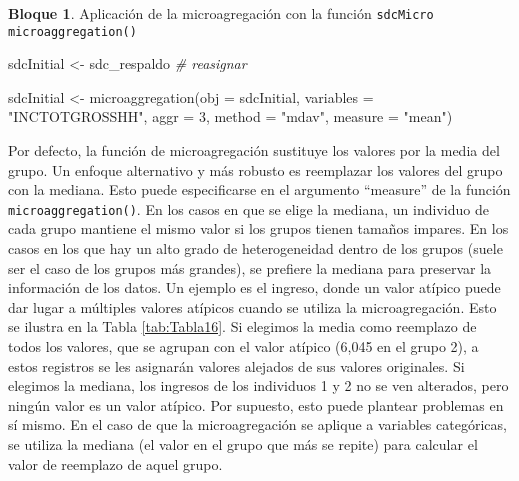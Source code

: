 \documentclass[
]{book}
\newenvironment{Shaded}{\begin{snugshade}}{\end{snugshade}}
\newcommand{\AttributeTok}[1]{\textcolor[rgb]{0.77,0.63,0.00}{#1}}
\newcommand{\CommentTok}[1]{\textcolor[rgb]{0.56,0.35,0.01}{\textit{#1}}}
\newcommand{\DecValTok}[1]{\textcolor[rgb]{0.00,0.00,0.81}{#1}}
\newcommand{\FunctionTok}[1]{\textcolor[rgb]{0.00,0.00,0.00}{#1}}
\newcommand{\NormalTok}[1]{#1}
\newcommand{\OtherTok}[1]{\textcolor[rgb]{0.56,0.35,0.01}{#1}}
\newcommand{\StringTok}[1]{\textcolor[rgb]{0.31,0.60,0.02}{#1}}
\theoremstyle{definition}
\theoremstyle{definition}
\newtheorem{example}{Bloque}[chapter]
\theoremstyle{definition}
\theoremstyle{definition}
\theoremstyle{remark}
\begin{document}
\hypertarget{section-4}{%
\subsubsection{}\label{section-4}}

\begin{example}
\protect\hypertarget{exm:bloque30jgm}{}\label{exm:bloque30jgm}Aplicación de la microagregación con la función \texttt{sdcMicro} \texttt{microaggregation()}
\end{example}

\begin{Shaded}
\begin{Highlighting}[]
\NormalTok{sdcInitial }\OtherTok{\textless{}{-}}\NormalTok{ sdc\_respaldo }\CommentTok{\# reasignar}

\NormalTok{sdcInitial }\OtherTok{\textless{}{-}} \FunctionTok{microaggregation}\NormalTok{(}\AttributeTok{obj =}\NormalTok{ sdcInitial, }\AttributeTok{variables =} \StringTok{"INCTOTGROSSHH"}\NormalTok{, }\AttributeTok{aggr =} \DecValTok{3}\NormalTok{, }\AttributeTok{method =} \StringTok{"mdav"}\NormalTok{, }\AttributeTok{measure =} \StringTok{"mean"}\NormalTok{)}
\end{Highlighting}
\end{Shaded}

Por defecto, la función de microagregación sustituye los valores por la media del grupo. Un enfoque alternativo y más robusto es reemplazar los valores del grupo con la mediana. Esto puede especificarse en el argumento ``measure'' de la función \texttt{microaggregation()}. En los casos en que se elige la mediana, un individuo de cada grupo mantiene el mismo valor si los grupos tienen tamaños impares. En los casos en los que hay un alto grado de heterogeneidad dentro de los grupos (suele ser el caso de los grupos más grandes), se prefiere la mediana para preservar la información de los datos. Un ejemplo es el ingreso, donde un valor atípico puede dar lugar a múltiples valores atípicos cuando se utiliza la microagregación. Esto se ilustra en la Tabla \ref{tab:Tabla16}. Si elegimos la media como reemplazo de todos los valores, que se agrupan con el valor atípico (6,045 en el grupo 2), a estos registros se les asignarán valores alejados de sus valores originales. Si elegimos la mediana, los ingresos de los individuos 1 y 2 no se ven alterados, pero ningún valor es un valor atípico. Por supuesto, esto puede plantear problemas en sí mismo. En el caso de que la microagregación se aplique a variables categóricas, se utiliza la mediana (el valor en el grupo que más se repite) para calcular el valor de reemplazo de aquel grupo.
\end{document}
